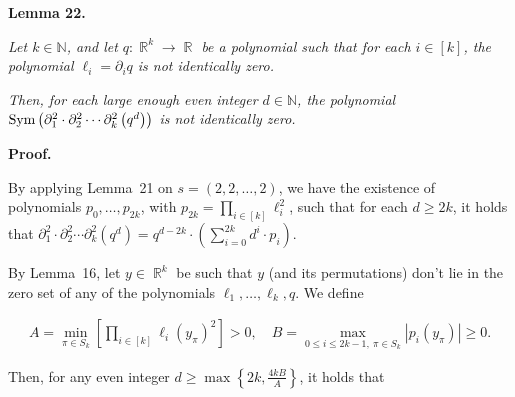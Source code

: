 

\par\medskip\noindent\textbf{
\textbf{Lemma 22}\textbf{.}
}\par



\emph{Let $k\in\mathbb{N}$, and let $q:\mathop{\mathbb{R}}^{k}\to\mathop{\mathbb{R}}$ be a polynomial such that for each $i\in[k]$, the polynomial $\ell_{i}=\partial_{i}q$ is not identically zero.}\par




\emph{Then, for each large enough even integer $d\in\mathbb{N}$, the polynomial $\textnormal{Sym}\left(\partial_{1}^{2}\cdot\partial_{2}^{2}\cdots\partial_{k}^{2}\left(q^{d}\right)\right)$ is not identically zero.}\par







\par\medskip\noindent\textbf{Proof.}\par




By applying Lemma 21 on $s=(2,2,\dots,2)$, we have the existence of polynomials $p_{0},\dots,p_{2k}$, with $p_{2k}=\prod_{i\in[k]}\ell_{i}^{2}$, such that for each $d\geqslant 2k$, it holds that $\partial_{1}^{2}\cdot\partial_{2}^{2}\cdots\partial_{k}^{2}\left(q^{d}\right)=q^{d-2k}\cdot\left(\sum_{i=0}^{2k}d^{i}\cdot p_{i}\right)$.\par




By Lemma 16, let $y\in\mathop{\mathbb{R}}^{k}$ be such that $y$ (and its permutations) don’t lie in the zero set of any of the polynomials $\ell_{1},\dots,\ell_{k},q$.
We define\par


\[\begin{gathered}
A=\min_{\pi\in S_{k}}\left[\prod_{i\in[k]}\ell_{i}\left(y_{\pi}\right)^{2}\right]>0,\quad B=\max_{0\leqslant i\leqslant 2k-1,\ \pi\in S_{k}}\left|p_{i}(y_{\pi})\right|\geqslant 0.
\end{gathered}\]


Then, for any even integer $d\geqslant\max\left\{2k,\frac{4kB}{A}\right\}$, it holds that\par


